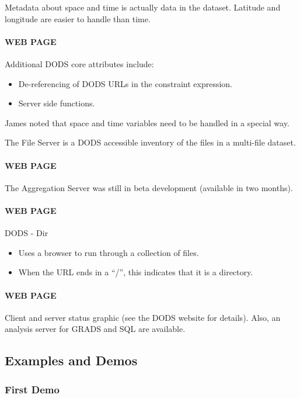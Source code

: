 Metadata about space and time is actually data in the dataset.
Latitude and longitude are easier to handle than time.

\paragraph{WEB PAGE}  Additional DODS core attributes include:
\begin{itemize}
\item De-referencing of DODS URLs in the constraint expression.
\item Server side functions.
\end{itemize}

James noted that space and time variables need to be handled in a
special way.

The File Server is a DODS accessible inventory of the files in a
multi-file dataset.

\paragraph{WEB PAGE}  The Aggregation Server was still in beta development (available in two 
months).

\paragraph{WEB PAGE}  DODS - Dir
\begin{itemize}
\item Uses a browser to run through a collection of files.
\item When the URL ends in a ``/'', this indicates that it is a directory.
\end{itemize}

\paragraph{WEB PAGE}  Client and server status graphic (see the DODS website for details).
Also, an analysis server for GRADS and SQL are available.

\subsection{Examples and Demos}

\subsubsection{First Demo}

